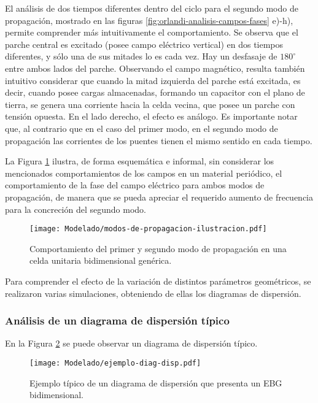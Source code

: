 El análisis de dos tiempos diferentes dentro del ciclo para el segundo modo de propagación, mostrado en las figuras \ref{fig:orlandi-analisis-campos-fases} e)-h), permite comprender más intuitivamente el comportamiento. Se observa que el parche central es excitado (posee campo eléctrico vertical) en dos tiempos diferentes, y sólo una de sus mitades lo es cada vez. Hay un desfasaje de $180^\circ$ entre ambos lados del parche. Observando el campo magnético, resulta también intuitivo considerar que cuando la mitad izquierda del parche está excitada, es decir, cuando posee cargas almacenadas, formando un capacitor con el plano de tierra, se genera una corriente hacia la celda vecina, que posee un parche con tensión opuesta. En el lado derecho, el efecto es análogo. Es importante notar que, al contrario que en el caso del primer modo, en el segundo modo de propagación las corrientes de los puentes tienen el mismo sentido en cada tiempo.

La Figura \ref{fig:dibujito-modos} ilustra, de forma esquemática e informal, sin considerar los mencionados comportamientos de los campos en un material periódico, el comportamiento de la fase del campo eléctrico para ambos modos de propagación, de manera que se pueda apreciar el requerido aumento de frecuencia para la concreción del segundo modo.

\begin{figure}[h]
	\centering
	\texttt{[image: Modelado/modos-de-propagacion-ilustracion.pdf]}
	\caption{Comportamiento del primer y segundo modo de propagación en una celda unitaria bidimensional genérica.}
	\label{fig:dibujito-modos}
\end{figure}


Para comprender el efecto de la variación de distintos parámetros geométricos, se realizaron varias simulaciones, obteniendo de ellas los diagramas de dispersión.

\subsubsection{Análisis de un diagrama de dispersión típico}

En la Figura \ref{fig:diag-dispersion-tipico} se puede observar un diagrama de dispersión típico.

\begin{figure}[h]
	\centering
	\texttt{[image: Modelado/ejemplo-diag-disp.pdf]}
	\caption{Ejemplo típico de un diagrama de dispersión que presenta un EBG bidimensional.}
	\label{fig:diag-dispersion-tipico}
\end{figure}

